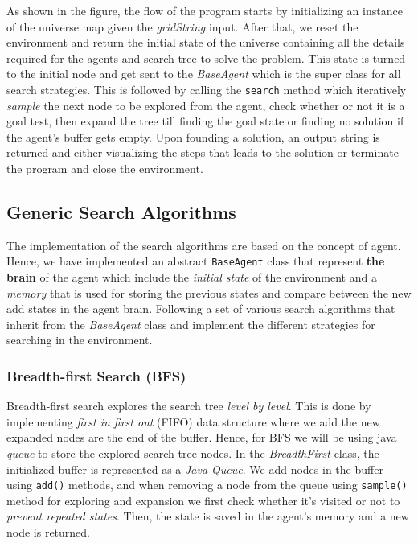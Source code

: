 \documentclass{article}
\newcommand{\code}[1]{\colorbox{codegray}{\texttt{#1}}}
\begin{document}
As shown in the figure, the flow of the program starts by initializing an instance of the universe map given the \textit{gridString} input. After that, we reset the environment and return the initial state of the universe containing all the details required for the agents and search tree to solve the problem. This state is turned to the initial node and get sent to the \textit{BaseAgent} which is the super class for all search strategies. This is followed by calling the \code{search} method which iteratively \textit{sample} the next node to be explored from the agent, check whether or not it is a goal test, then expand the tree till finding the goal state or finding no solution if the agent's buffer gets empty. Upon founding a solution, an output string is returned and either visualizing the steps that leads to the solution or terminate the program and close the environment.

\subsection{Generic Search Algorithms}

The implementation of the search algorithms are based on the concept of agent. Hence, we have implemented an abstract \code{BaseAgent} class that represent \textbf{the brain} of the agent which include the \textit{initial state} of the environment and a \textit{memory} that is used for storing the previous states and compare between the new add states in the agent brain. Following a set of various search algorithms that inherit from the \textit{BaseAgent} class and implement the different strategies for searching in the environment.

\subsubsection{Breadth-first Search (BFS)}\label{bfs}
Breadth-first search explores the search tree \textit{level by level}. This is done by implementing \textit{first in first out} (FIFO) data structure where we add the new expanded nodes are the end of the buffer. Hence, for BFS we will be using java \textit{queue} to store the explored search tree nodes. In the \textit{BreadthFirst} class, the initialized buffer is represented as a \textit{Java Queue}. We add nodes in the buffer using \code{add()} methods, and when removing a node from the queue using \code{sample()} method for exploring and expansion we first check whether it’s visited or not to \textit{prevent repeated states}. Then, the state is saved in the agent's memory and a new node is returned.
\end{document}
